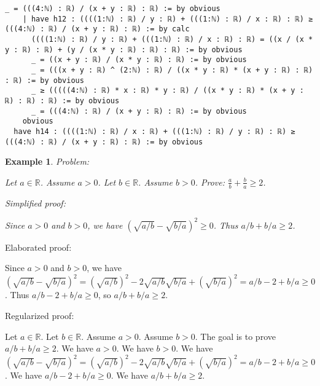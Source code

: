 \documentclass{article}
\newtheorem{example}{Example}
\begin{document}
\begin{tcolorbox}[colback=white!10, width=\linewidth]
\begin{lstlisting}[language=Lean4]
      _ = (((4:ℕ) : ℝ) / (x + y : ℝ) : ℝ) := by obvious
    | have h12 : ((((1:ℕ) : ℝ) / y : ℝ) + (((1:ℕ) : ℝ) / x : ℝ) : ℝ) ≥ (((4:ℕ) : ℝ) / (x + y : ℝ) : ℝ) := by calc
      ((((1:ℕ) : ℝ) / y : ℝ) + (((1:ℕ) : ℝ) / x : ℝ) : ℝ) = ((x / (x * y : ℝ) : ℝ) + (y / (x * y : ℝ) : ℝ) : ℝ) := by obvious
      _ = ((x + y : ℝ) / (x * y : ℝ) : ℝ) := by obvious
      _ = (((x + y : ℝ) ^ (2:ℕ) : ℝ) / ((x * y : ℝ) * (x + y : ℝ) : ℝ) : ℝ) := by obvious
      _ ≥ (((((4:ℕ) : ℝ) * x : ℝ) * y : ℝ) / ((x * y : ℝ) * (x + y : ℝ) : ℝ) : ℝ) := by obvious
      _ = (((4:ℕ) : ℝ) / (x + y : ℝ) : ℝ) := by obvious
    obvious
  have h14 : ((((1:ℕ) : ℝ) / x : ℝ) + (((1:ℕ) : ℝ) / y : ℝ) : ℝ) ≥ (((4:ℕ) : ℝ) / (x + y : ℝ) : ℝ) := by obvious

\end{lstlisting}
\end{tcolorbox}


\begin{example}
Problem:
\begin{tcolorbox}[colback=yellow!10, width=\linewidth]
Let $a\in\mathbb{R}$. Assume $a > 0$.
    Let $b\in\mathbb{R}$. Assume $b > 0$.
    Prove: $\frac{a}{b} + \frac{b}{a} \ge 2$.
\end{tcolorbox}

Simplified proof:
\begin{tcolorbox}[colback=blue!10, width=\linewidth]
Since $a>0$ and $b>0$, we have $(\sqrt{a/b} - \sqrt{b/a})^2 \ge 0$. Thus $a/b + b/a \ge 2$.
\end{tcolorbox}
\end{example}

Elaborated proof:
\begin{tcolorbox}[colback=green!10, width=\linewidth]
Since $a>0$ and $b>0$, we have $(\sqrt{a/b} - \sqrt{b/a})^2 = (\sqrt{a/b})^2 - 2\sqrt{a/b}\sqrt{b/a} + (\sqrt{b/a})^2 = a/b - 2 + b/a \ge 0$. Thus $a/b - 2 + b/a \ge 0$, so $a/b + b/a \ge 2$.
\end{tcolorbox}

Regularized proof:
\begin{tcolorbox}[colback=red!10, width=\linewidth]
Let $a\in\mathbb{R}$.
Let $b\in\mathbb{R}$.
Assume $a>0$.
Assume $b>0$.
The goal is to prove $a/b + b/a \ge 2$.
We have $a>0$.
We have $b>0$.
We have ${{(\sqrt{a/b} - \sqrt{b/a})}}^2 = {{(\sqrt{a/b})}}^2 - 2\sqrt{a/b}\sqrt{b/a} + {{(\sqrt{b/a})}}^2 = a/b - 2 + b/a \ge 0$.
We have $a/b - 2 + b/a \ge 0$.
We have $a/b + b/a \ge 2$.
\end{tcolorbox}
\end{document}
